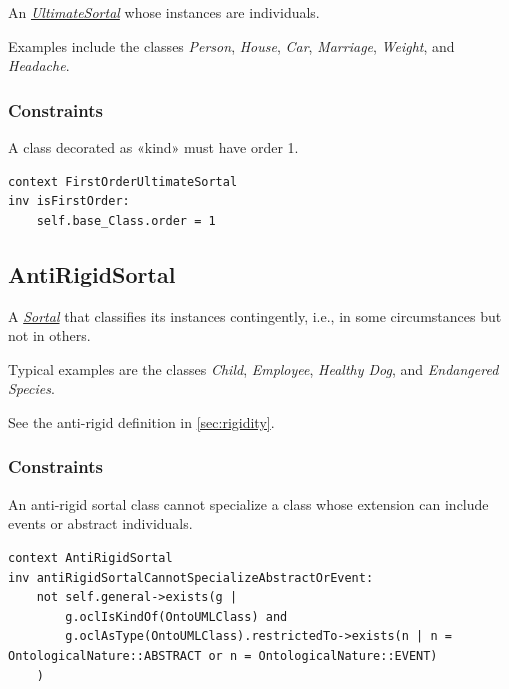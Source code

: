 An \hyperref[stereotype:ultimateSortal]{\textit{UltimateSortal}} whose instances are individuals.

Examples include the classes \textit{Person}, \textit{House}, \textit{Car}, \textit{Marriage}, \textit{Weight}, and \textit{Headache}.

\subsubsection{Constraints}

\begin{constraint}
\label{kindIsFirstOrder}
A class decorated as «kind» must have order 1.

\begin{lstlisting}[language=OCL]
context FirstOrderUltimateSortal 
inv isFirstOrder: 
    self.base_Class.order = 1
\end{lstlisting}
\end{constraint}

\subsection{AntiRigidSortal}
\label{stereotype:antiRigidSortal}

A \hyperref[stereotype:sortal]{\textit{Sortal}} that classifies its instances contingently, i.e., in some circumstances but not in others.

Typical examples are the classes \textit{Child}, \textit{Employee}, \textit{Healthy Dog}, and \textit{Endangered Species}.

See the anti-rigid definition in \autoref{sec:rigidity}.

\subsubsection{Constraints}

\begin{constraint}
\label{constraint:antiRigidSortalCannotSpecializeAbstractOrEvent}

An anti-rigid sortal class cannot specialize a class whose extension can include events or abstract individuals.

\begin{lstlisting}[language=OCL]
context AntiRigidSortal
inv antiRigidSortalCannotSpecializeAbstractOrEvent:
    not self.general->exists(g |
        g.oclIsKindOf(OntoUMLClass) and
        g.oclAsType(OntoUMLClass).restrictedTo->exists(n | n = OntologicalNature::ABSTRACT or n = OntologicalNature::EVENT)
    )
\end{lstlisting}
\end{constraint}

